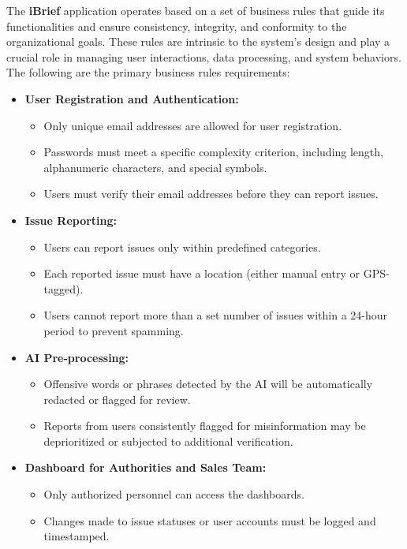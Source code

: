 The \textbf{iBrief} application operates based on a set of business rules that guide its functionalities and ensure consistency, integrity, and conformity to the organizational goals. These rules are intrinsic to the system's design and play a crucial role in managing user interactions, data processing, and system behaviors. The following are the primary business rules requirements:

\begin{itemize}
    \item \textbf{User Registration and Authentication:} 
    \begin{itemize}
        \item Only unique email addresses are allowed for user registration.
        \item Passwords must meet a specific complexity criterion, including length, alphanumeric characters, and special symbols.
        \item Users must verify their email addresses before they can report issues.
    \end{itemize}
    
    \item \textbf{Issue Reporting:} 
    \begin{itemize}
        \item Users can report issues only within predefined categories. 
        \item Each reported issue must have a location (either manual entry or GPS-tagged).
        \item Users cannot report more than a set number of issues within a 24-hour period to prevent spamming.
    \end{itemize}
    
    \item \textbf{AI Pre-processing:}
    \begin{itemize}
        \item Offensive words or phrases detected by the AI will be automatically redacted or flagged for review.
        \item Reports from users consistently flagged for misinformation may be deprioritized or subjected to additional verification.
    \end{itemize}

    \item \textbf{Dashboard for Authorities and Sales Team:}
    \begin{itemize}
        \item Only authorized personnel can access the dashboards.
        \item Changes made to issue statuses or user accounts must be logged and timestamped.
    \end{itemize}


\end{itemize}
